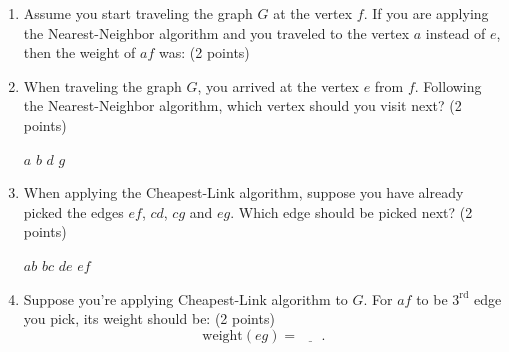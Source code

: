 \documentclass[12pt]{exam}
\begin{document}
\begin{enumerate}
\begin{enumerate}
\begin{figure}[h]
        
    \end{figure}
    \vfill 
    \item Assume you start traveling the graph $G$ at the vertex $f$. If you are applying the Nearest-Neighbor algorithm and you traveled to the vertex $a$ instead of $e$, then the weight of $af$ was: (2 points)
    \begin{checkboxes}
    \end{checkboxes}
    \vfill
    \item When traveling the graph $G$, you arrived at the vertex $e$ from $f$. Following the Nearest-Neighbor algorithm, which vertex should you visit next? (2 points)
    \begin{checkboxes}
        \choice $a$
        \choice $b$
        \choice $d$
        \choice $g$
    \end{checkboxes}
    \vfill
    \item When applying the Cheapest-Link algorithm, suppose you have already picked the edges $ef$, $cd$, $cg$ and $eg$. Which edge should be picked next? (2 points)
    \begin{checkboxes}
        \choice $ab$
        \choice $bc$
        \choice $de$
        \choice $ef$
    \end{checkboxes}
    \vfill
    \item \label{lastQnSec1} Suppose you're applying Cheapest-Link algorithm to $G$. For $af$ to be $3^{\text{rd}}$ edge you pick, its weight should be: (2 points)
    \vspace{0.5em}
    $$\text{weight}(eg)=\underline{\phantom{ans}}.$$
    \vfill
\end{enumerate}

\end{enumerate}
\end{document}
